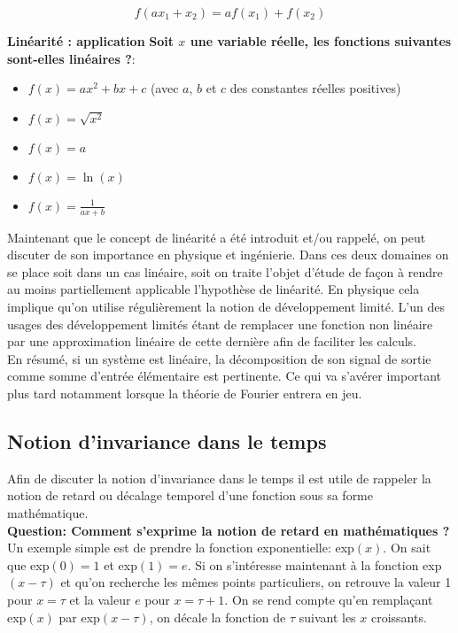 \documentclass[11pt,a4paper]{article}
\begin{document}
\[f(a x_1 + x_2) = a f(x_1) + f(x_2)  \] 

\textbf{Linéarité : application}
\textbf{Soit $x$ une variable réelle, les fonctions suivantes sont-elles linéaires ?}:
\begin{itemize}
\item $f(x) = a x^2 + b x + c$ (avec $a$, $b$ et $c$ des constantes réelles positives) 
\item $f(x) = \sqrt{x^2}$
\item $f(x) = a$
\item $f(x) = \ln(x)$
\item $f(x) = \frac{1}{a x + b}$
\end{itemize}

Maintenant que le concept de linéarité a été introduit et/ou rappelé, on peut discuter de son importance en physique et ingénierie. Dans ces deux domaines on se place soit dans un cas linéaire, soit on traite l'objet d'étude de façon à rendre au moins partiellement applicable l'hypothèse de linéarité. En physique cela implique qu'on utilise régulièrement la notion de développement limité. L'un des usages des développement limités étant de remplacer une fonction non linéaire par une approximation linéaire de cette dernière afin de faciliter les calculs.\\

En résumé, si un système est linéaire, la décomposition de son signal de sortie comme somme d'entrée élémentaire est pertinente. Ce qui va s'avérer important plus tard notamment lorsque la théorie de Fourier entrera en jeu.

\subsection{Notion d'invariance dans le temps}
Afin de discuter la notion d'invariance dans le temps il est utile de rappeler la notion de retard ou décalage temporel d'une fonction sous sa forme mathématique.\\

\textbf{Question: Comment s'exprime la notion de retard en mathématiques ?}\\

Un exemple simple est de prendre la fonction exponentielle: exp$(x)$. On sait que exp$(0) = 1$ et exp$(1) = e$. Si on s'intéresse maintenant à la fonction exp$(x-\tau)$ et qu'on recherche les mêmes points particuliers, on retrouve la valeur 1 pour $x = \tau$ et la valeur $e$ pour $x= \tau + 1$. On se rend compte qu'en remplaçant exp$(x)$ par exp$(x-\tau)$, on décale la fonction de $\tau$ suivant les $x$ croissants.  
\end{document}
